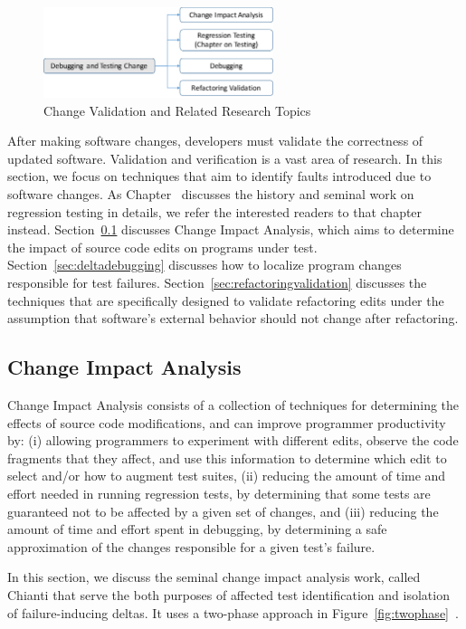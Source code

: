 \begin{figure}[ht]
 \centering
 \includegraphics[width=0.6\textwidth]{images/ChangeValidation.pdf} 
 \caption{Change Validation and Related Research Topics} 
 \label{fig:changevalidation} 
\end{figure}

After making software changes, developers must validate the correctness of updated software. Validation and verification is a vast area of research. In this section, we focus on techniques that aim to identify faults introduced due to software changes. As Chapter~ discusses the history and seminal work on regression testing in details, we refer the interested readers to that chapter instead. Section~\ref{sec:CIA} discusses Change Impact Analysis, which aims to determine the impact of source code edits on programs under test. Section~\ref{sec:deltadebugging} discusses how to localize program changes responsible for test failures. Section~\ref{sec:refactoringvalidation} discusses the techniques that are specifically designed to validate refactoring edits under the assumption that software's external behavior should not change after refactoring. 

\subsection{Change Impact Analysis} 
\label{sec:CIA} 
Change Impact Analysis consists of a collection of techniques for determining the effects of source code modifications, and can improve programmer productivity by: (i) allowing programmers to experiment with different edits, observe the code fragments that they affect, and use this information to determine which edit to select and/or how to augment test suites, (ii) reducing the amount of time and effort needed in running regression tests, by determining that some tests are guaranteed not to be affected by a given set of changes, and (iii) reducing the amount of time and effort spent in debugging, by determining a safe approximation of the changes responsible for a given test’s failure. 

In this section, we discuss the seminal change impact analysis work, called Chianti that serve the both purposes of affected test identification and isolation of failure-inducing deltas. 
It uses a two-phase approach in Figure~\ref{fig:twophase}~\cite{Ren2004}. 

